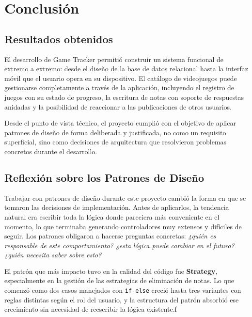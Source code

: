 
\chapter{Conclusión}

\section{Resultados obtenidos}

El desarrollo de Game Tracker permitió construir un sistema funcional de
extremo a extremo: desde el diseño de la base de datos relacional hasta la
interfaz móvil que el usuario opera en su dispositivo. El catálogo de
videojuegos puede gestionarse completamente a través de la aplicación,
incluyendo el registro de juegos con su estado de progreso, la escritura de
notas con soporte de respuestas anidadas y la posibilidad de reaccionar a
las publicaciones de otros usuarios.

Desde el punto de vista técnico, el proyecto cumplió con el objetivo de
aplicar patrones de diseño de forma deliberada y justificada, no como un
requisito superficial, sino como decisiones de arquitectura que resolvieron
problemas concretos durante el desarrollo.

\section{Reflexión sobre los Patrones de Diseño}

Trabajar con patrones de diseño durante este proyecto cambió la forma en que
se tomaron las decisiones de implementación. Antes de aplicarlos, la tendencia
natural era escribir toda la lógica donde pareciera más conveniente en el
momento, lo que terminaba generando controladores muy extensos y difíciles de
seguir. Los patrones obligaron a hacerse preguntas concretas: \textit{¿quién
es responsable de este comportamiento? ¿esta lógica puede cambiar en el futuro?
¿quién necesita saber sobre esto?}

El patrón que más impacto tuvo en la calidad del código fue \textbf{Strategy},
especialmente en la gestión de las estrategias de eliminación de notas. Lo que
comenzó como dos casos manejados con \texttt{if-else} creció hasta tres
variantes con reglas distintas según el rol del usuario, y la estructura del
patrón absorbió ese crecimiento sin necesidad de reescribir la lógica
existente.f


